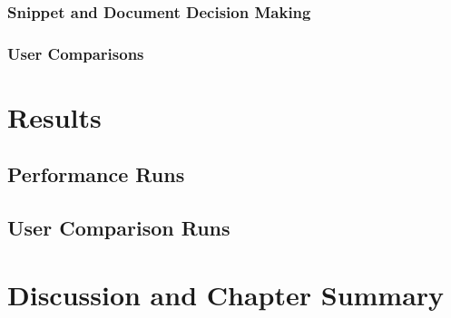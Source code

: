 \subsubsection{Snippet and Document Decision Making}

\subsubsection{User Comparisons}

\section{Results}

\subsection{Performance Runs}

\subsection{User Comparison Runs}

\section{Discussion and Chapter Summary}